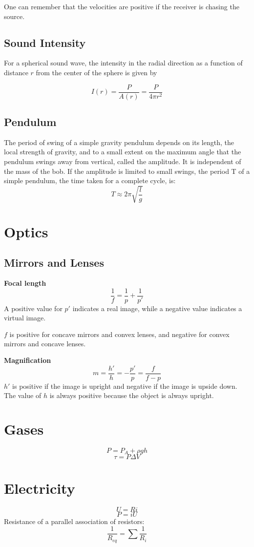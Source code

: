 \documentclass[oneside]{book} %
\theoremstyle{plain}
\newcommand*\reciprocal[1]{\frac{1}{#1}}
\begin{document}
One can remember that the velocities are positive if the receiver is chasing
the source.

\section{Sound Intensity}
For a spherical sound wave, the intensity in the radial direction as a function
of distance \(r\) from the center of the sphere is given by

\[I(r) = \frac{P}{A(r)} = \frac{P}{4 \pi r^2}\]

\section{Pendulum}
The period of swing of a simple gravity pendulum depends on its length, the
local strength of gravity, and to a small extent on the maximum angle that the
pendulum swings away from vertical, called the amplitude. It is independent of
the mass of the bob. If the amplitude is limited to small swings, the period T
of a simple pendulum, the time taken for a complete cycle, is:
\[T \approx 2 \pi \sqrt{\frac{l}{g}}\]

\chapter{Optics}
\section{Mirrors and Lenses}
\textbf{Focal length}
\[\reciprocal{f} = \reciprocal{p} + \reciprocal{p'}\]
A positive value for \(p'\) indicates a real image, while a negative value
indicates a virtual image.

\(f\) is positive for concave mirrors and convex lenses, and negative for convex
mirrors and concave lenses.

\textbf{Magnification}
\[m = \frac{h'}{h} = - \frac{p'}{p} = \frac{f}{f - p}\]
\(h'\) is positive if the image is upright and negative if the image is upside
down. The value of \(h\) is always positive because the object is always
upright.

\chapter{Gases}
\[P = P_A + \rho g h\]
\[\tau = P \Delta V\]

\chapter{Electricity}
\[U = R i\]
\[P = i U\]
Resistance of a parallel association of resistors:
\[\reciprocal{R_{eq}} = \sum{\reciprocal{R_i}}\]
\end{document}
